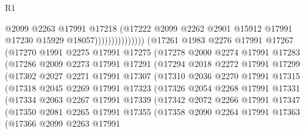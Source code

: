 \begin{lexlean}{R1}
\begin{coremodule}
                                    @2099
                                    @2263
                                    @17991
                                    @17218
                                    (@17222
                                      @2099
                                      @2262
                                      @2901
                                      @15912
                                      @17991
                                      @17230
                                      @15929
                                      @18057)))))))))))))))
        (@17261
          @1983
          @2276
          @17991
          @17267
          (@17270
            @1991
            @2275
            @17991
            @17275
            (@17278
              @2000
              @2274
              @17991
              @17283
              (@17286
                @2009
                @2273
                @17991
                @17291
                (@17294
                  @2018
                  @2272
                  @17991
                  @17299
                  (@17302
                    @2027
                    @2271
                    @17991
                    @17307
                    (@17310
                      @2036
                      @2270
                      @17991
                      @17315
                      (@17318
                        @2045
                        @2269
                        @17991
                        @17323
                        (@17326
                          @2054
                          @2268
                          @17991
                          @17331
                          (@17334
                            @2063
                            @2267
                            @17991
                            @17339
                            (@17342
                              @2072
                              @2266
                              @17991
                              @17347
                              (@17350
                                @2081
                                @2265
                                @17991
                                @17355
                                (@17358
                                  @2090
                                  @2264
                                  @17991
                                  @17363
                                  (@17366
                                    @2099
                                    @2263
                                    @17991

\end{coremodule}
\end{lexlean}
